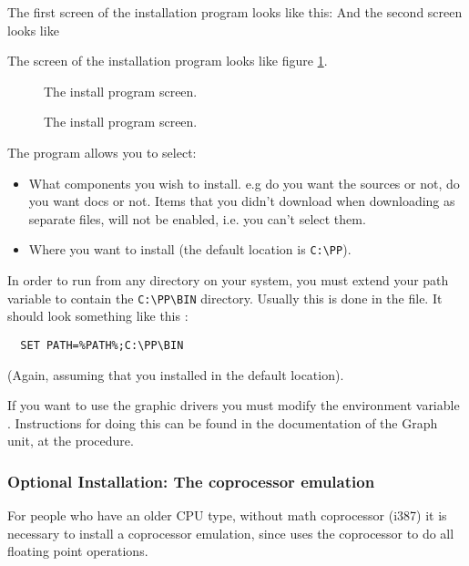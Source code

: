 \documentclass{report}
\begin{document}
\begin{htmlonly}
The first screen of the installation program looks like this:
And the second screen looks like
\end{htmlonly}
\begin{latexonly}
The screen of the installation program looks like figure \ref{fig:install}.
\begin{figure}
\caption{The \dos install program screen.}
\label{fig:install}
\ifpdf
{}
\end{figure}
\begin{figure}
\caption{The \dos install program screen.}
\label{fig:installb}
\else
{}
\fi
\end{figure}
\end{latexonly}

The program allows you to select:
\begin{itemize}
\item What components you wish to install. e.g do you want the sources or
not, do you want docs or not. Items that you didn't download when
downloading as separate files, will not be enabled, i.e. you can't
select them.

\item Where you want to install (the default location is \verb|C:\PP|).
\end{itemize}

In order to run \fpc from any directory on your system, you must extend
your path variable to contain the \verb|C:\PP\BIN| directory.
Usually this is done in the  file.
It should look something like this :
\begin{verbatim}
  SET PATH=%PATH%;C:\PP\BIN
\end{verbatim}
(Again, assuming that you installed in the default location).

If you want to use the graphic drivers you must modify the
environment variable . Instructions for doing this can be found
in the documentation of the Graph unit, at the  procedure.

\subsubsection{Optional Installation: The coprocessor emulation}
For people who have an older CPU type, without math coprocessor (i387)
it is necessary to install a coprocessor emulation, since \fpc uses the
coprocessor to do all floating point operations.
\end{document}
